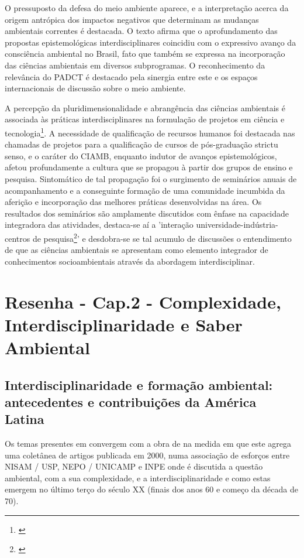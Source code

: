 \documentclass[
   article,       %
   12pt,          %
   oneside,       %
   a4paper,       %
   english,       %
   brazil,           %
   sumario=tradicional
   ]{abntex2}
\begin{document}
O pressuposto da defesa do meio ambiente aparece, e a interpretação acerca da origem antrópica dos impactos negativos que determinam as mudanças ambientais correntes é destacada. O texto afirma que o aprofundamento das propostas epistemológicas interdisciplinares coincidiu com o expressivo avanço da consciência ambiental no Brasil, fato que também se expressa na incorporação das ciências ambientais em diversos subprogramas. O reconhecimento da relevância do PADCT é destacado pela sinergia entre este e os espaços internacionais de discussão sobre o meio ambiente.

A percepção da pluridimensionalidade e abrangência das ciências ambientais é associada às práticas interdisciplinares na formulação de projetos em ciência e tecnologia\footnote{\cite[p.8]{Interdisciplinaridade_CT}}. A necessidade de qualificação de recursos humanos foi destacada nas chamadas de projetos para a qualificação de cursos de pós-graduação strictu senso, e o caráter do CIAMB, enquanto indutor de avanços epistemológicos, afetou profundamente a cultura que se propagou à partir dos grupos de ensino e pesquisa. Sintomático de tal propagação foi o surgimento de seminários anuais de acompanhamento e a conseguinte formação de uma comunidade incumbida da aferição e incorporação das melhores práticas desenvolvidas na área. Os resultados dos seminários são amplamente discutidos com ênfase na capacidade integradora das atividades, destaca-se aí a 'interação universidade-indústria-centros de pesquisa\footnote{\cite[p.14]{Interdisciplinaridade_CT}}' e desdobra-se se tal acumulo de discussões o entendimento de que as ciências ambientais se apresentam como elemento integrador de conhecimentos socioambientais através da abordagem interdisciplinar.



\newpage

\section{Resenha - Cap.2 - Complexidade, Interdisciplinaridade e Saber Ambiental}

\subsection{Interdisciplinaridade e formação ambiental:
antecedentes e contribuições da América Latina}


Os temas presentes em \cite{Agenda_2030} convergem com a obra de \citeauthor{Interdisciplinaridade_Ambientais} na medida em que este agrega uma coletânea de artigos publicada em 2000, numa associação de esforços entre NISAM / USP, NEPO / UNICAMP e INPE onde é discutida a questão ambiental, com a sua complexidade, e a interdisciplinaridade e como estas emergem no último terço do século XX (finais dos anos 60 e começo da década de 70).
\end{document}
